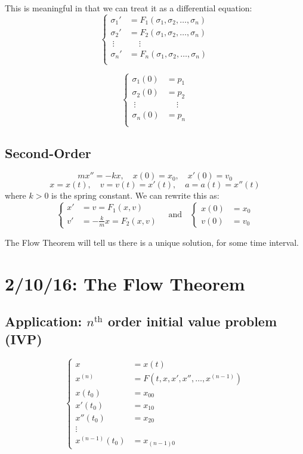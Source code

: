 \documentclass[12pt]{article}
\begin{document}
This is meaningful in that we can treat it as a differential equation:
\[
\begin{cases}
\sigma_1' &= F_1(\sigma_1,\sigma_2,\dots,\sigma_n) \\
\sigma_2' &= F_2(\sigma_1,\sigma_2,\dots,\sigma_n) \\
\ \vdots &\ \quad \vdots \\
\sigma_n' &= F_n(\sigma_1,\sigma_2,\dots,\sigma_n) \\
\end{cases}
\]

\[
\begin{cases}
\sigma_1(0) &= p_1 \\
\sigma_2(0) &= p_2 \\
\ \vdots &\ \quad \vdots \\
\sigma_n(0) &= p_n \\
\end{cases}
\]

\subsection{Second-Order}
\[ mx'' = -kx, \quad x(0) = x_0, \quad x'(0) = v_0 \]
\[ x = x(t), \quad v = v(t) = x'(t), \quad a = a(t) = x''(t) \]
where $k > 0$ is the spring constant. We can rewrite this as:
\[
\begin{cases}
x' &= v = F_1(x,v) \\
v' &= -\frac{k}{m}x = F_2(x,v)
\end{cases}
\quad \text{and} \quad 
\begin{cases}
x(0) &= x_0 \\
v(0) &= v_0
\end{cases}
\]

The Flow Theorem will tell us there is a unique solution, for some time interval.

\section{2/10/16: The Flow Theorem}

\subsection{Application: $n^{\text{th}}$ order initial value problem (IVP)}
\[
\begin{cases}
x &= x(t) \\
x^{(n)} &= F(t,x,x',x'',\dots,x^{(n-1)}) \\
x(t_0) &= x_{00} \\
x'(t_0) &= x_{10} \\
x''(t_0) &= x_{20} \\
\vdots \\
x^{(n-1)}(t_0) &= x_{(n-1)0}
\end{cases}
\]
\end{document}

